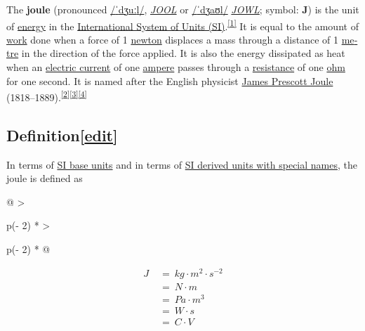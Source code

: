 \documentclass[
]{article}
\newenvironment{LTR}{\beginL}{\endL}
\begin{document}
\begin{LTR}
\begin{otherlanguage}{english}
The \textbf{joule} (pronounced
{\foreignlanguage{english}{\href{/wiki/Help:IPA/English}{/{{ˈ}{dʒ}{uː}{l}}/}}},
\href{/wiki/Help:Pronunciation_respelling_key}{\emph{{JOOL}}} or
{\foreignlanguage{english}{\href{/wiki/Help:IPA/English}{/{{ˈ}{dʒ}{aʊ}{l}}/}}}
\href{/wiki/Help:Pronunciation_respelling_key}{\emph{{JOWL}}}; symbol:
\textbf{J}) is the unit of \href{/wiki/Energy}{energy} in the
\href{/wiki/International_System_of_Units}{International System of Units
(SI)}.\textsuperscript{\hyperref[cite_note-1]{{[}1{]}}} It is equal to
the amount of \href{/wiki/Work_(physics)}{work} done when a force of 1
\href{/wiki/Newton_(unit)}{newton} displaces a mass through a distance
of 1 \href{/wiki/Metre}{metre} in the direction of the force applied. It
is also the energy dissipated as heat when an
\href{/wiki/Electric_current}{electric current} of one
\href{/wiki/Ampere}{ampere} passes through a
\href{/wiki/Electrical_resistance_and_conductance}{resistance} of one
\href{/wiki/Ohm}{ohm} for one second. It is named after the English
physicist \href{/wiki/James_Prescott_Joule}{James Prescott Joule}
(1818--1889).\textsuperscript{\hyperref[cite_note-2]{{[}2{]}}\hyperref[cite_note-3]{{[}3{]}}\hyperref[cite_note-4]{{[}4{]}}}

\subsection[{{{[}}\href{/w/index.php?title=Joule&action=edit&section=1}{{edit}}{{]}}}]{\texorpdfstring{\label{Definition}{Definition}{{{[}}\href{/w/index.php?title=Joule&action=edit&section=1}{{edit}}{{]}}}}{Definition{[}edit{]}}}\label{definitionedit}

In terms of \href{/wiki/SI_base_units}{SI base units} and in terms of
\href{/wiki/SI_derived_units_with_special_names}{SI derived units with
special names}, the joule is defined as

\begin{longtable}[]{@{}
  >{\raggedright\arraybackslash}p{(\columnwidth - 2\tabcolsep) * }
  >{\raggedright\arraybackslash}p{(\columnwidth - 2\tabcolsep) * }@{}}
\toprule\noalign{}
\endhead
\bottomrule\noalign{}
\endlastfoot
\begin{minipage}[t]{\linewidth}\raggedright
\[\begin{matrix}
{J\;} & {= \ {kg \cdot m^{2} \cdot s^{- 2}}} \\
 & {= \ {N \cdot m}} \\
 & {= \ {Pa \cdot m^{3}}} \\
 & {= \ {W \cdot s}} \\
 & {= \ {C \cdot V}}
\end{matrix}\]


\end{minipage}
\end{longtable}
\end{otherlanguage}
\end{LTR}
\end{document}
